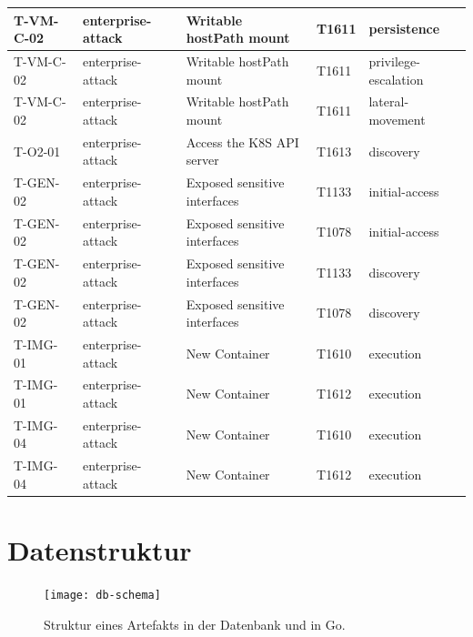 \begin{longtable}{|l|l|l|l|l|}
    T-VM-C-02 & enterprise-attack & Writable hostPath mount & T1611 & persistence \\ \hline
    T-VM-C-02 & enterprise-attack & Writable hostPath mount & T1611 & privilege-escalation \\ \hline
    T-VM-C-02 & enterprise-attack & Writable hostPath mount & T1611 & lateral-movement \\ \hline
    T-O2-01 & enterprise-attack & Access the K8S API server & T1613 & discovery \\ \hline
    T-GEN-02 & enterprise-attack & Exposed sensitive interfaces & T1133 & initial-access \\ \hline
    T-GEN-02 & enterprise-attack & Exposed sensitive interfaces & T1078 & initial-access \\ \hline
    T-GEN-02 & enterprise-attack & Exposed sensitive interfaces & T1133 & discovery \\ \hline
    T-GEN-02 & enterprise-attack & Exposed sensitive interfaces & T1078 & discovery \\ \hline
    T-IMG-01 & enterprise-attack & New Container & T1610 & execution \\ \hline
    T-IMG-01 & enterprise-attack & New Container & T1612 & execution \\ \hline
    T-IMG-04 & enterprise-attack & New Container & T1610 & execution \\ \hline
    T-IMG-04 & enterprise-attack & New Container & T1612 & execution \\ \hline
\end{longtable}
\restoregeometry

\chapter{Datenstruktur}
\label{app:db-schema}

\begin{figure}[H]
    \centering
    \texttt{[image: db-schema]}
    \caption{Struktur eines Artefakts in der Datenbank und in Go.}
\end{figure}

